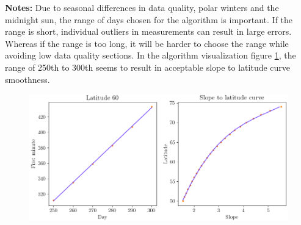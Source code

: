 \noindent
\textbf{Notes:}
Due to seasonal differences in data quality, polar winters and the midnight sun, the range of days chosen for the algorithm is important. If the range is short, individual outliers in measurements can result in large errors. Whereas if the range is too long, it will be harder to choose the range while avoiding low data quality sections. In the algorithm visualization figure \ref{fig_slope_to_latitude}, the range of 250th to 300th seems to result in acceptable slope to latitude curve smoothness.
\newpage

\begin{figure}[ht!]
\centering
\includegraphics[width=1\linewidth]{pics/slope_to_latitude3}



\label{fig_slope_to_latitude}
\end{figure}




